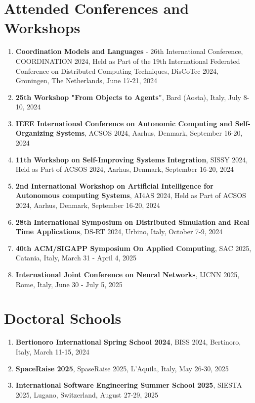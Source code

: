 \documentclass[runningheads]{llncs}
\begin{document}
\section{Attended Conferences and Workshops}
\begin{enumerate}
    \item \textbf{Coordination Models and Languages} - 26th International Conference, COORDINATION 2024, Held as Part of the 19th International Federated Conference on Distributed Computing Techniques, DisCoTec 2024, Groningen, The Netherlands, June 17-21, 2024
    \item \textbf{25th Workshop "From Objects to Agents"}, Bard (Aosta), Italy, July 8-10, 2024
    \item \textbf{IEEE International Conference on Autonomic Computing and Self-Organizing Systems}, ACSOS 2024, Aarhus, Denmark, September 16-20, 2024
    \item \textbf{11th Workshop on Self-Improving Systems Integration}, SISSY 2024, Held as Part of ACSOS 2024, Aarhus, Denmark, September 16-20, 2024
    \item \textbf{2nd International Workshop on Artificial Intelligence for Autonomous computing Systems}, AI4AS 2024, Held as Part of ACSOS 2024, Aarhus, Denmark, September 16-20, 2024
    \item \textbf{28th International Symposium on Distributed Simulation and Real Time Applications}, DS-RT 2024, Urbino, Italy, October 7-9, 2024
    \item \textbf{40th ACM/SIGAPP Symposium On Applied Computing}, SAC 2025, Catania, Italy, March 31 - April 4, 2025
    \item \textbf{International Joint Conference on Neural Networks}, IJCNN 2025, Rome, Italy,  June 30 - July 5, 2025
\end{enumerate}

\section{Doctoral Schools}
\begin{enumerate}
    \item \textbf{Bertionoro International Spring School 2024}, BISS 2024, Bertinoro, Italy, March 11-15, 2024
    \item \textbf{SpaceRaise 2025}, SpaseRaise 2025, L'Aquila, Italy, May 26-30, 2025
    \item \textbf{International Software Engineering Summer School 2025}, SIESTA 2025, Lugano, Switzerland, August 27-29, 2025
\end{enumerate}
\end{document}
